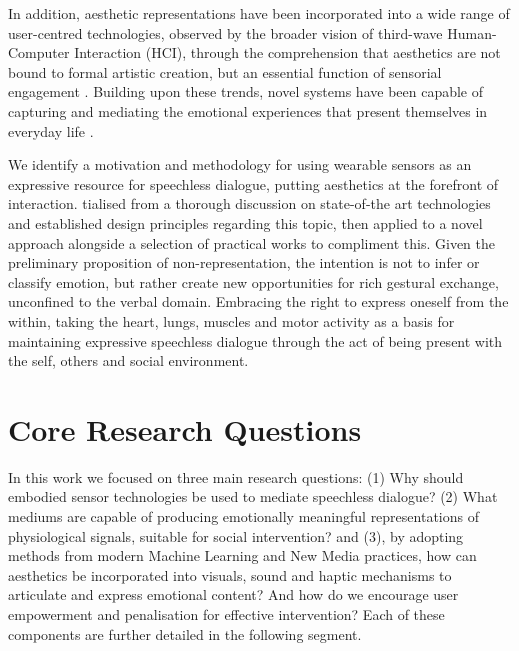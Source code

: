 In addition, aesthetic representations have been incorporated into a wide range of user-centred technologies, observed by the broader vision of third-wave Human-Computer Interaction (HCI), through the comprehension that aesthetics are not bound to formal artistic creation, but an essential function of sensorial engagement \cite{bodker2015third}. Building upon these trends, novel systems have been capable of capturing and mediating the emotional experiences that present themselves in everyday life \cite{schiphorst_designing_2020}.

We identify a motivation and methodology for using wearable sensors as an expressive resource for speechless dialogue, putting aesthetics at the forefront of interaction. tialised from a thorough discussion on state-of-the art technologies and established design principles regarding this topic, then applied to a novel approach alongside a selection of practical works to compliment this. Given the preliminary proposition of non-representation, the intention is not to infer or classify emotion, but rather create new opportunities for rich gestural exchange, unconfined to the verbal domain. Embracing the right to express oneself from the within, taking the heart, lungs, muscles and motor activity as a basis for maintaining expressive speechless dialogue through the act of being present with the self, others and social environment.

\section{Core Research Questions}
\label{sec:research_questions}

In this work we focused on three main research questions: (1) Why should embodied sensor technologies be used to mediate speechless dialogue? (2) What mediums are capable of producing emotionally meaningful representations of physiological signals, suitable for social intervention? and (3), by adopting methods from modern Machine Learning and New Media practices, how can aesthetics be incorporated into visuals, sound and haptic mechanisms to articulate and express emotional content? And how do we encourage user empowerment and penalisation for effective intervention? Each of these components are further detailed in the following segment.

    

